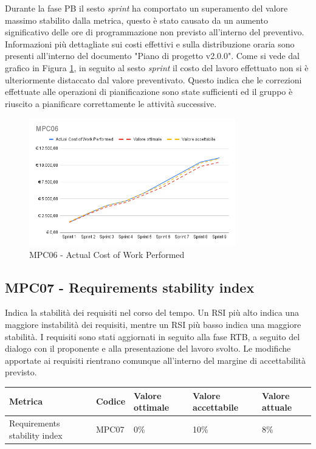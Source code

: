 Durante la fase PB il sesto \textit{sprint} ha comportato un superamento del valore massimo stabilito dalla metrica, questo è stato causato da un aumento significativo delle ore di programmazione non previsto all'interno del preventivo.
Informazioni più dettagliate sui costi effettivi e sulla distribuzione oraria sono presenti all'interno del documento "Piano di progetto v2.0.0".
Come si vede dal grafico in Figura \ref{fig:mpc06}, in seguito al sesto \textit{sprint} il costo del lavoro effettuato non si è ulteriormente distaccato dal valore preventivato.
Questo indica che le correzioni effettuate alle operazioni di pianificazione sono state sufficienti ed il gruppo è riuscito a pianificare correttamente le attività successive.
\begin{figure}[htbp]
    \centering
    \includegraphics[width=0.8\textwidth]{img/MPC06.png}
    \caption{MPC06 - Actual Cost of Work Performed}
    \label{fig:mpc06}
\end{figure}


\subsection{MPC07 - Requirements stability index}
\label{s:mpc07}
Indica la stabilità dei requisiti nel corso del tempo.
Un RSI più alto indica una maggiore instabilità dei requisiti, mentre un RSI più basso indica una maggiore stabilità.
I requisiti sono stati aggiornati in seguito alla fase RTB, a seguito del dialogo con il proponente e alla presentazione del lavoro svolto.
Le modifiche apportate ai requisiti rientrano comunque all'interno del margine di accettabilità previsto.
\begin{table}[H]
    \centering
    \begin{tabularx}{\textwidth}{X|l|l|l|l}
        \hline
        \textbf{Metrica}             & \textbf{Codice} & \textbf{Valore ottimale} & \textbf{Valore accettabile} & \textbf{Valore attuale} \\
        \hline
        Requirements stability index & MPC07           & 0\%                      & 10\%                        & 8\%                     \\
        \hline
    \end{tabularx}
\end{table}


